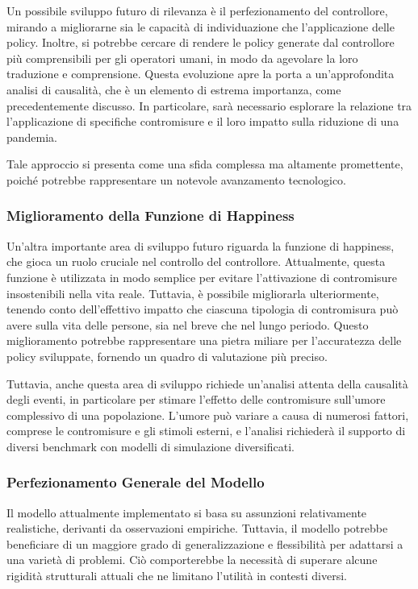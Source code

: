 Un possibile sviluppo futuro di rilevanza è il perfezionamento del 
controllore, mirando a migliorarne sia le capacità di individuazione 
che l'applicazione delle policy. Inoltre, si potrebbe cercare di 
rendere le policy generate dal controllore più comprensibili per 
gli operatori umani, in modo da agevolare la loro traduzione e 
comprensione. Questa evoluzione apre la porta a un'approfondita 
analisi di causalità, che è un elemento di estrema importanza, 
come precedentemente discusso. In particolare, sarà necessario 
esplorare la relazione tra l'applicazione di specifiche 
contromisure e il loro impatto sulla riduzione di una pandemia.

Tale approccio si presenta come una sfida complessa ma altamente 
promettente, poiché potrebbe rappresentare un notevole 
avanzamento tecnologico.

\subsubsection{Miglioramento della Funzione di Happiness}

Un'altra importante area di sviluppo futuro riguarda la funzione 
di happiness, che gioca un ruolo cruciale nel controllo del 
controllore. Attualmente, questa funzione è utilizzata in 
modo semplice per evitare l'attivazione di contromisure insostenibili 
nella vita reale. Tuttavia, è possibile migliorarla ulteriormente, 
tenendo conto dell'effettivo impatto che ciascuna tipologia di 
contromisura può avere sulla vita delle persone, sia nel breve 
che nel lungo periodo. Questo miglioramento potrebbe rappresentare 
una pietra miliare per l'accuratezza delle policy sviluppate, 
fornendo un quadro di valutazione più preciso.

Tuttavia, anche questa area di sviluppo richiede un'analisi 
attenta della causalità degli eventi, in particolare per stimare 
l'effetto delle contromisure sull'umore complessivo di una popolazione. 
L'umore può variare a causa di numerosi fattori, comprese le 
contromisure e gli stimoli esterni, e l'analisi richiederà il 
supporto di diversi benchmark con modelli di simulazione diversificati.

\subsubsection{Perfezionamento Generale del Modello}

Il modello attualmente implementato si basa su assunzioni 
relativamente realistiche, derivanti da osservazioni empiriche. 
Tuttavia, il modello potrebbe beneficiare di un maggiore grado 
di generalizzazione e flessibilità per adattarsi a una varietà di 
problemi. Ciò comporterebbe la necessità di superare alcune rigidità 
strutturali attuali che ne limitano l'utilità in contesti diversi.


